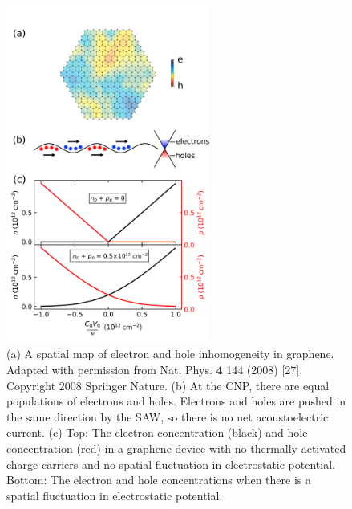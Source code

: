 \documentclass{beavtex_dub_edit}
\begin{document}
\begin{figure}
    \includegraphics[width =  0.6\textwidth]{Figure 3 n and p_corrected.png}
    \caption[Illustration of mixed-carrier acoustoelectric charge transport in h-BN-encapsulated graphene.]{(a) A spatial map of electron and hole inhomogeneity in graphene. Adapted with permission from Nat. Phys. \textbf{4} 144 (2008) [27]. Copyright 2008 Springer Nature. (b) At the CNP, there are equal populations of electrons and holes. Electrons and holes are pushed in the same direction by the SAW, so there is no net acoustoelectric current. (c) Top: The electron concentration (black) and hole concentration (red) in a graphene device with no thermally activated charge carriers and no spatial fluctuation in electrostatic potential. Bottom: The electron and hole concentrations when there is a spatial fluctuation in electrostatic potential.}
    \label{AECP Figure 3}
\end{figure}
\end{document}
